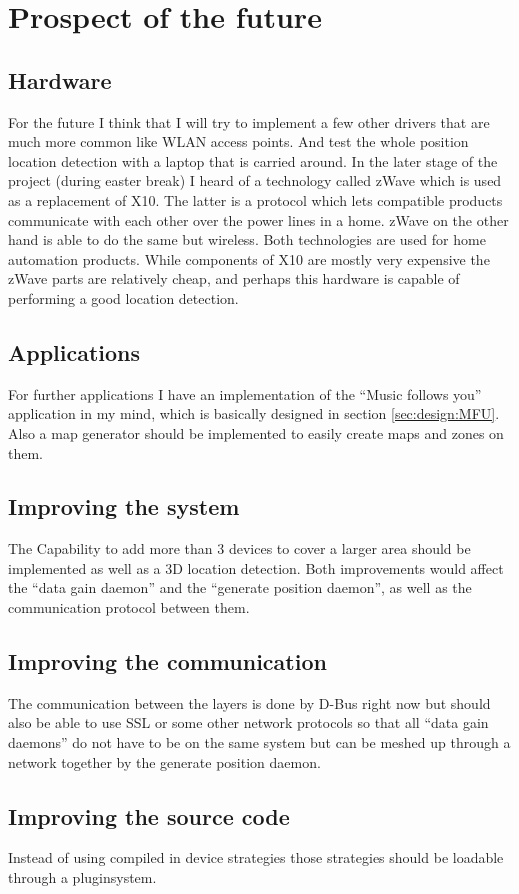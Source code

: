 \chapter{Prospect of the future}

 \section*{Hardware}
  For the future I think that I will try to implement a few other drivers that are much more common like WLAN access points. And test the whole position location detection with a laptop that is carried around. In the later stage of the project (during easter break) I heard of a technology called zWave which is used as a replacement of X10. The latter is a protocol which lets compatible products communicate with each other over the power lines in a home. zWave on the other hand is able to do the same but wireless. Both technologies are used for home automation products. While components of X10 are mostly very expensive the zWave parts are relatively cheap, and perhaps this hardware is capable of performing a good location detection.

 \section*{Applications}
  For further applications I have an implementation of the ``Music follows you'' application in my mind, which is basically designed in section \ref{sec:design:MFU}. Also a map generator should be implemented to easily create maps and zones on them.

 \section*{Improving the system}
  The Capability to add more than 3 devices to cover a larger area should be implemented as well as a 3D location detection. Both improvements would affect the ``data gain daemon'' and the ``generate position daemon'', as well as the communication protocol between them.

 \section*{Improving the communication}
  The communication between the layers is done by D-Bus right now but should also be able to use SSL or some other network protocols so that all ``data gain daemons'' do not have to be on the same system but can be meshed up through a network together by the generate position daemon.

 \section*{Improving the source code}
  Instead of using compiled in device strategies those strategies should be loadable through a pluginsystem.
